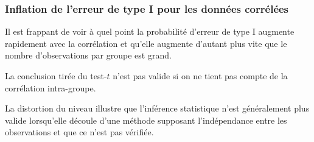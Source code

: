 \documentclass{beamer}
\begin{document}
\begin{frame}
\frametitle{Inflation de l'erreur de type I pour les données corrélées}
\bi
\item Il est frappant de voir à quel point la probabilité
d'erreur de type I augmente rapidement avec la corrélation et qu'elle augmente
d'autant plus vite que le nombre d'observations par groupe est grand. 
\item La
conclusion tirée du test-$t$ n'est pas valide si on ne tient pas compte de la
corrélation intra-groupe.
\item La distortion du niveau illustre que l'inférence statistique n'est généralement
plus valide lorsqu'elle découle d'une méthode supposant l'indépendance entre
les observations et que ce n'est pas vérifiée.
\ei
\end{frame}
\end{document}
